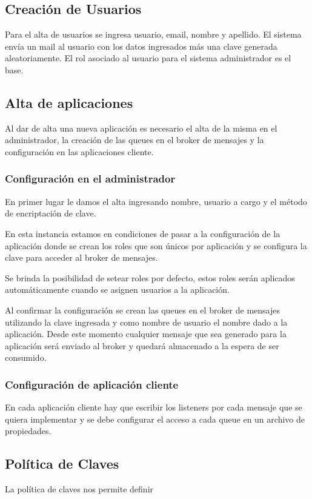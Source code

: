 \subsection{Creación de Usuarios}

Para el alta de usuarios se ingresa usuario, email, nombre y apellido.
El sistema envía un mail al usuario con los datos ingresados más una clave generada aleatoriamente. El rol asociado al usuario para el sistema administrador es el base. 

\subsection{Alta de aplicaciones}
Al dar de alta una nueva aplicación es necesario el alta de la misma en el administrador, la creación de las queues en el broker de mensajes y la configuración en las aplicaciones cliente.
 
\subsubsection{Configuración en el administrador}
En primer lugar le damos el alta ingresando nombre, usuario a cargo y el método de encriptación de clave.

En esta instancia estamos en condiciones de pasar a la configuración de la aplicación donde se crean los roles que son únicos por aplicación y se configura la clave para acceder al broker de mensajes.

Se brinda la posibilidad de setear roles por defecto, estos roles serán aplicados automáticamente cuando se asignen usuarios a la aplicación. 

Al confirmar la configuración se crean las queues en el broker de mensajes utilizando la clave ingresada y como nombre de usuario el nombre dado a la aplicación. Desde este momento cualquier mensaje que sea generado para la aplicación será enviado al broker y quedará almacenado a la espera de ser consumido.

\subsubsection{Configuración de aplicación cliente}
En cada aplicación cliente hay que escribir los listeners por cada mensaje que se quiera implementar y se debe configurar el acceso a cada queue en un archivo de propiedades. 

\subsection{Política de Claves}
La política de claves nos permite definir

